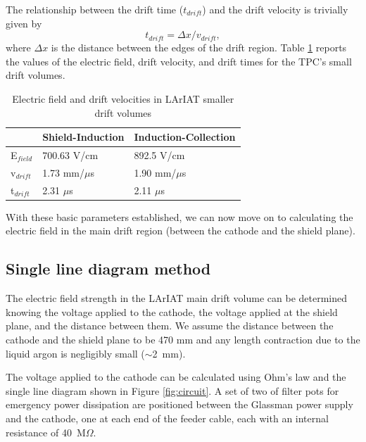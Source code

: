 The relationship between the drift time ($t_{drift}$) and the drift velocity is trivially given by
\begin{equation}
t_{drift} = \Delta x/v_{drift}, \label{eq:drifttime}
\end{equation}
where $\Delta x$ is the distance between the edges of the drift region.
Table \ref{tab:Efields} reports the values of the electric field, drift velocity, and drift times for the TPC's small drift volumes. 

\begin{table}[]
\centering
\caption{Electric field and drift velocities in LArIAT smaller drift volumes}
\label{tab:Efields}
\begin{tabular}{|l|l|l|}
\hline
& Shield-Induction & Induction-Collection \\ \hline
E$_{field}$ &                 700.63 V/cm        &                892.5  V/cm             \\ \hline
v$_{drift}$ &                   1.73  mm/$\mu$s   &                  1.90 mm/$\mu$s        \\ \hline
t$_{drift}$ &                   2.31  $\mu$s      &                   2.11 $\mu$s          \\ \hline

\end{tabular}
\end{table}

With these basic parameters established, we can now move on to calculating the electric field in the main drift region (between the cathode and the shield plane).

\subsection*{Single line diagram method}
The electric field strength in the LArIAT main drift volume can be determined knowing the voltage applied to the cathode, the voltage applied at the shield plane, and the distance between them. We assume the distance between the cathode and the shield plane to be 470 mm and any length contraction due to the liquid argon is negligibly small ($\sim$2~mm).

The voltage applied to the cathode can be calculated using Ohm's law and the single line diagram shown in Figure \ref{fig:circuit}.  A set of two of filter pots for emergency power dissipation are positioned between the Glassman power supply and the cathode, one at each end of the feeder cable, each with an internal resistance of 40~M$\Omega$. 


